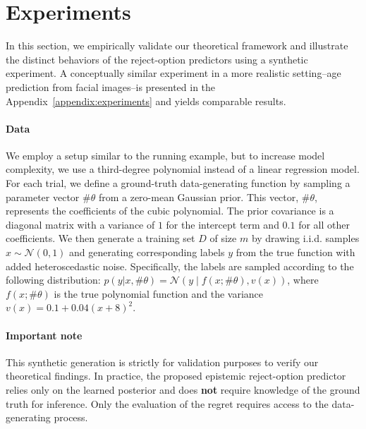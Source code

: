 \section{Experiments}
In this section, we empirically validate our theoretical framework and illustrate the distinct behaviors of the reject-option predictors using a synthetic experiment. 
A conceptually similar experiment in a more realistic setting--age prediction from facial images--is presented in the Appendix~\ref{appendix:experiments} and yields comparable results. 

\vspace{-0.2cm}

\paragraph{Data} We employ a setup similar to the running example, but to increase model complexity, we use a third-degree polynomial instead of a linear regression model. For each trial, we define a ground-truth data-generating function by sampling a parameter vector $\#\theta$ from a zero-mean Gaussian prior. This vector, $\#\theta$, represents the coefficients of the cubic polynomial. The prior covariance is a diagonal matrix with a variance of $1$ for the intercept term and $0.1$ for all other coefficients. We then generate a training set $D$ of size $m$ by drawing i.i.d. samples $x \sim \mathcal{N}(0, 1)$ and generating corresponding labels $y$ from the true function with added heteroscedastic noise. Specifically, the labels are sampled according to the following distribution: $p(y|x, \#\theta) = \mathcal{N}( y\mid f(x; \#\theta), v(x))$, where $f(x; \#\theta)$ is the true polynomial function and the variance $v(x) = 0.1 + 0.04(x + 8)^2$.

\vspace{-0.2cm}

\paragraph{Important note} This synthetic generation is strictly for validation purposes to verify our theoretical findings. In practice, the proposed epistemic reject-option predictor relies only on the learned posterior and does \textbf{not} require knowledge of the ground truth for inference. Only the evaluation of the regret requires access to the data-generating process.

\vspace{-0.2cm}

